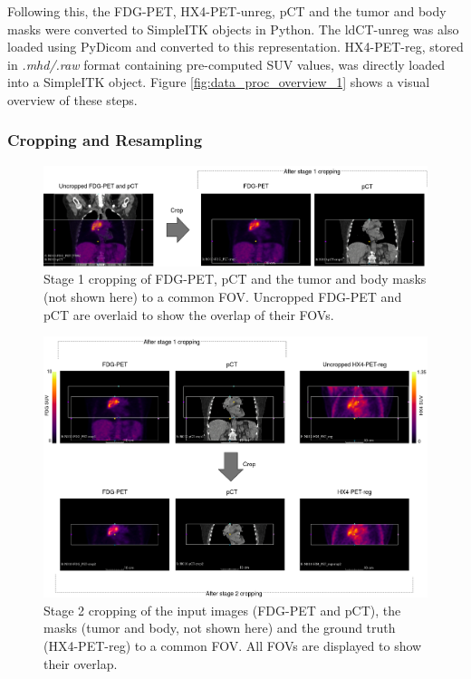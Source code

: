 Following this, the FDG-PET, HX4-PET-unreg, pCT and the tumor and body masks were converted to SimpleITK objects in Python. The ldCT-unreg was also loaded using PyDicom and converted to this representation. HX4-PET-reg, stored in \textit{.mhd/.raw} format containing pre-computed SUV values, was directly loaded into a SimpleITK object. Figure \ref{fig:data_proc_overview_1} shows a visual overview of these steps.

\subsubsection{Cropping and Resampling}
\begin{figure}[h!]
    \centering
    \includegraphics[width=\linewidth]{figures/Data/fdgpet_pct_crop1/N010-FDG_PET_pCT-uncropped_crop1.png}
    \caption{Stage 1 cropping of FDG-PET, pCT and the tumor and body masks (not shown here) to a common FOV. Uncropped FDG-PET and pCT are overlaid to show the overlap of their FOVs.}
    \label{fig:fdg_pet_pct_crop1}
\end{figure}

\begin{figure}[h!]
    \centering
    \includegraphics[width=\linewidth]{figures/Data/fdgpet_pct_fx4petreg_crop2/N010-fdgpet_pct_hx4petreg-uncropped_crop2.png}
    \caption{Stage 2 cropping of the input images (FDG-PET and pCT), the masks (tumor and body, not shown here) and the ground truth (HX4-PET-reg) to a common FOV. All FOVs are displayed to show their overlap.}
    \label{fig:fdgpet_pct_hx4petreg_crop2}
\end{figure}

